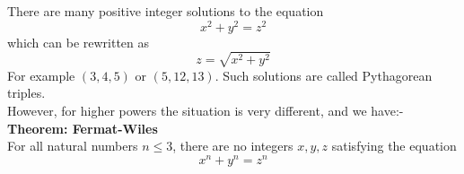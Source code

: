 \documentclass[a4paper]{article}
\begin{document}
There are many positive integer solutions to the equation
\[x^2+y^2=z^2\]
which can be rewritten as
\[z=\sqrt{x^2+y^2}\]
For example $(3, 4, 5)$ or $(5, 12, 13)$. Such solutions are called Pythagorean
triples.\\
However, for higher powers the situation is very different, and we have:-\\
\textbf{Theorem: Fermat-Wiles}\\
For all natural numbers $n \leq 3$, there are no integers $x, y, z$ satisfying the
equation
\[x^n+y^n=z^n\]
\end{document}
